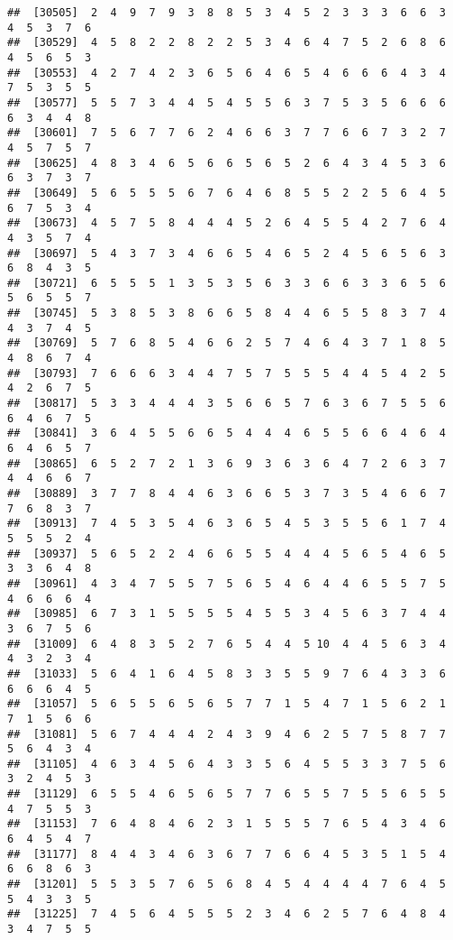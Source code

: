 \documentclass[
]{book}
\begin{document}
\begin{verbatim}
##  [30505]  2  4  9  7  9  3  8  8  5  3  4  5  2  3  3  3  6  6  3  4  5  3  7  6
##  [30529]  4  5  8  2  2  8  2  2  5  3  4  6  4  7  5  2  6  8  6  4  5  6  5  3
##  [30553]  4  2  7  4  2  3  6  5  6  4  6  5  4  6  6  6  4  3  4  7  5  3  5  5
##  [30577]  5  5  7  3  4  4  5  4  5  5  6  3  7  5  3  5  6  6  6  6  3  4  4  8
##  [30601]  7  5  6  7  7  6  2  4  6  6  3  7  7  6  6  7  3  2  7  4  5  7  5  7
##  [30625]  4  8  3  4  6  5  6  6  5  6  5  2  6  4  3  4  5  3  6  6  3  7  3  7
##  [30649]  5  6  5  5  5  6  7  6  4  6  8  5  5  2  2  5  6  4  5  6  7  5  3  4
##  [30673]  4  5  7  5  8  4  4  4  5  2  6  4  5  5  4  2  7  6  4  4  3  5  7  4
##  [30697]  5  4  3  7  3  4  6  6  5  4  6  5  2  4  5  6  5  6  3  6  8  4  3  5
##  [30721]  6  5  5  5  1  3  5  3  5  6  3  3  6  6  3  3  6  5  6  5  6  5  5  7
##  [30745]  5  3  8  5  3  8  6  6  5  8  4  4  6  5  5  8  3  7  4  4  3  7  4  5
##  [30769]  5  7  6  8  5  4  6  6  2  5  7  4  6  4  3  7  1  8  5  4  8  6  7  4
##  [30793]  7  6  6  6  3  4  4  7  5  7  5  5  5  4  4  5  4  2  5  4  2  6  7  5
##  [30817]  5  3  3  4  4  4  3  5  6  6  5  7  6  3  6  7  5  5  6  6  4  6  7  5
##  [30841]  3  6  4  5  5  6  6  5  4  4  4  6  5  5  6  6  4  6  4  6  4  6  5  7
##  [30865]  6  5  2  7  2  1  3  6  9  3  6  3  6  4  7  2  6  3  7  4  4  6  6  7
##  [30889]  3  7  7  8  4  4  6  3  6  6  5  3  7  3  5  4  6  6  7  7  6  8  3  7
##  [30913]  7  4  5  3  5  4  6  3  6  5  4  5  3  5  5  6  1  7  4  5  5  5  2  4
##  [30937]  5  6  5  2  2  4  6  6  5  5  4  4  4  5  6  5  4  6  5  3  3  6  4  8
##  [30961]  4  3  4  7  5  5  7  5  6  5  4  6  4  4  6  5  5  7  5  4  6  6  6  4
##  [30985]  6  7  3  1  5  5  5  5  4  5  5  3  4  5  6  3  7  4  4  3  6  7  5  6
##  [31009]  6  4  8  3  5  2  7  6  5  4  4  5 10  4  4  5  6  3  4  4  3  2  3  4
##  [31033]  5  6  4  1  6  4  5  8  3  3  5  5  9  7  6  4  3  3  6  6  6  6  4  5
##  [31057]  5  6  5  5  6  5  6  5  7  7  1  5  4  7  1  5  6  2  1  7  1  5  6  6
##  [31081]  5  6  7  4  4  4  2  4  3  9  4  6  2  5  7  5  8  7  7  5  6  4  3  4
##  [31105]  4  6  3  4  5  6  4  3  3  5  6  4  5  5  3  3  7  5  6  3  2  4  5  3
##  [31129]  6  5  5  4  6  5  6  5  7  7  6  5  5  7  5  5  6  5  5  4  7  5  5  3
##  [31153]  7  6  4  8  4  6  2  3  1  5  5  5  7  6  5  4  3  4  6  6  4  5  4  7
##  [31177]  8  4  4  3  4  6  3  6  7  7  6  6  4  5  3  5  1  5  4  6  6  8  6  3
##  [31201]  5  5  3  5  7  6  5  6  8  4  5  4  4  4  4  7  6  4  5  5  4  3  3  5
##  [31225]  7  4  5  6  4  5  5  5  2  3  4  6  2  5  7  6  4  8  4  3  4  7  5  5

\end{verbatim}
\end{document}

